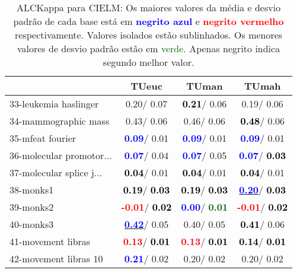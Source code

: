 \begin{table}[h]
\caption{ALCKappa para CIELM: Os maiores valores da média e desvio padrão de cada base está em \textcolor{blue}{\textbf{negrito azul}} e \textcolor{red}{\textbf{negrito vermelho}} respectivamente. Valores isolados estão sublinhados. Os menores valores de desvio padrão estão em \textcolor{darkgreen}{verde}. Apenas negrito indica segundo melhor valor.}
\begin{center}\begin{tabular}{lc|c|c}
 & TUeuc & TUman & TUmah\\ \hline 33-leukemia haslinger &   0.20/  0.07 & \textcolor{black}{\textbf{  0.21}}/  0.06 &   0.19/  0.06 \\
34-mammographic mass &   0.43/  0.06 &   0.46/  0.06 & \textcolor{black}{\textbf{  0.48}}/  0.06 \\
35-mfeat fourier & \textcolor{blue}{\textbf{  0.09}}/  0.01 & \textcolor{blue}{\textbf{  0.09}}/  0.01 & \textcolor{blue}{\textbf{  0.09}}/  0.01 \\
36-molecular promotor... & \textcolor{blue}{\textbf{  0.07}}/  0.04 & \textcolor{blue}{\textbf{  0.07}}/  0.05 & \textcolor{blue}{\textbf{  0.07}}/\textcolor{black}{\textbf{  0.03}} \\
37-molecular splice j... & \textcolor{black}{\textbf{  0.04}}/  0.01 & \textcolor{black}{\textbf{  0.04}}/  0.01 & \textcolor{black}{\textbf{  0.04}}/  0.01 \\
38-monks1 & \textcolor{black}{\textbf{  0.19}}/\textcolor{black}{\textbf{  0.03}} & \textcolor{black}{\textbf{  0.19}}/\textcolor{black}{\textbf{  0.03}} & \underline{\textcolor{blue}{\textbf{  0.20}}}/\textcolor{black}{\textbf{  0.03}} \\
39-monks2 & \textcolor{red}{\textbf{ -0.01}}/\textcolor{black}{\textbf{  0.02}} & \textcolor{blue}{\textbf{  0.00}}/\textcolor{darkgreen}{\textbf{  0.01}} & \textcolor{red}{\textbf{ -0.01}}/\textcolor{black}{\textbf{  0.02}} \\ \hline
40-monks3 & \underline{\textcolor{blue}{\textbf{  0.42}}}/  0.05 &   0.40/  0.05 & \textcolor{black}{\textbf{  0.41}}/  0.06 \\
41-movement libras & \textcolor{red}{\textbf{  0.13}}/\textcolor{black}{\textbf{  0.01}} & \textcolor{red}{\textbf{  0.13}}/\textcolor{black}{\textbf{  0.01}} & \textcolor{black}{\textbf{  0.14}}/\textcolor{black}{\textbf{  0.01}} \\
42-movement libras 10 & \textcolor{blue}{\textbf{  0.21}}/  0.02 &   0.20/  0.02 &   0.20/  0.02 \\

\end{tabular}
\end{center}
\end{table}
